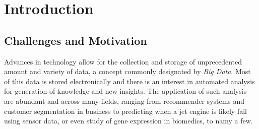 \chapter{Introduction}
\label{chapter:introduction}


\section{Challenges and Motivation}

 



Advances in technology allow for the collection and storage of unprecedented amount and variety of data, a concept commonly designated by \emph{Big Data}.
Most of this data is stored electronically and there is an interest in automated analysis for generation of knowledge and new insights.
The application of such analysis are abundant and across many fields, ranging from recommender systems and customer segmentation in business to predicting when a jet engine is likely fail using sensor data, or even study of gene expression in biomedics, to namy a few.

